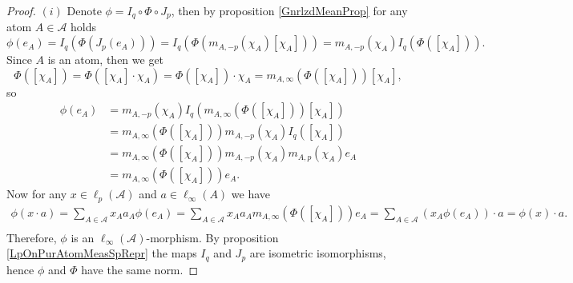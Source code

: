 \documentclass[12pt]{article}
\begin{document}
\begin{proof} 
    $(i)$ Denote $\phi=I_q\circ \Phi\circ J_p$, then by 
    proposition \ref{GnrlzdMeanProp} for any atom $A\in\mathcal{A}$ holds
    \[
        \phi(e_A)
        =I_q(\Phi(J_p(e_A)))
        =I_q(\Phi(m_{A,-p}(\chi_A)[\chi_A]))
        =m_{A,-p}(\chi_A)I_q(\Phi([\chi_A])).
    \]
    Since $A$ is an atom, then  we get
    \[
        \Phi([\chi_A])
        =\Phi([\chi_A]\cdot\chi_A)
        =\Phi([\chi_A])\cdot\chi_A
        =m_{A,\infty}(\Phi([\chi_A]))[\chi_A],
    \]
    so
    \[
    \begin{aligned}
        \phi(e_A)
        &=m_{A,-p}(\chi_A)I_q(m_{A,\infty}(\Phi([\chi_A]))[\chi_A]) \\
        &=m_{A,\infty}(\Phi([\chi_A]))m_{A,-p}(\chi_A)I_q([\chi_A]) \\
        &=m_{A,\infty}(\Phi([\chi_A]))m_{A,-p}(\chi_A)m_{A,p}(\chi_A)e_A \\
        &=m_{A,\infty}(\Phi([\chi_A]))e_A.
    \end{aligned}
    \]
    Now for any $x\in\ell_p(\mathcal{A})$ and $a\in\ell_\infty(A)$ we have
    \[
    \begin{aligned}
        \phi(x\cdot a)
        =\sum_{A\in\mathcal{A}} x_A a_A \phi(e_A) 
        =\sum_{A\in\mathcal{A}} x_A a_A m_{A,\infty}(\Phi([\chi_A]))e_A 
        =\sum_{A\in\mathcal{A}} (x_A \phi(e_A))\cdot a 
        =\phi(x)\cdot a. \\
    \end{aligned}
    \]
    Therefore, $\phi$ is an $\ell_\infty(\mathcal{A})$-morphism. By 
    proposition \ref{LpOnPurAtomMeasSpRepr} the maps $I_q$ and $J_p$ are 
    isometric isomorphisms, hence $\phi$ and $\Phi$ have the same norm.


\end{proof}
\end{document}
